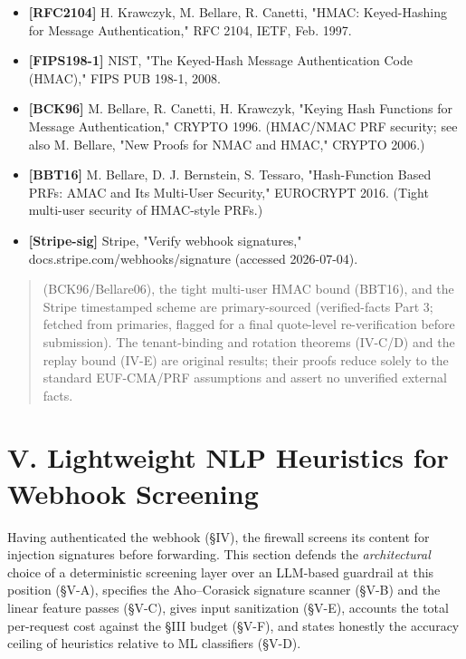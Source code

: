 \begin{itemize}
\tightlist
\item
  \textbf{{[}RFC2104{]}} H. Krawczyk, M. Bellare, R. Canetti, "HMAC:
  Keyed-Hashing for Message Authentication," RFC 2104, IETF, Feb. 1997.
\item
  \textbf{{[}FIPS198-1{]}} NIST, "The Keyed-Hash Message Authentication
  Code (HMAC)," FIPS PUB 198-1, 2008.
\item
  \textbf{{[}BCK96{]}} M. Bellare, R. Canetti, H. Krawczyk, "Keying Hash
  Functions for Message Authentication," CRYPTO 1996. (HMAC/NMAC PRF
  security; see also M. Bellare, "New Proofs for NMAC and HMAC," CRYPTO
  2006.)
\item
  \textbf{{[}BBT16{]}} M. Bellare, D. J. Bernstein, S. Tessaro,
  "Hash-Function Based PRFs: AMAC and Its Multi-User Security,"
  EUROCRYPT 2016. (Tight multi-user security of HMAC-style PRFs.)
\item
  \textbf{{[}Stripe-sig{]}} Stripe, "Verify webhook signatures,"
  docs.stripe.com/webhooks/signature (accessed 2026-07-04).
\end{itemize}

\begin{quote}
(BCK96/Bellare06), the tight multi-user HMAC bound (BBT16), and the
Stripe timestamped scheme are primary-sourced (verified-facts Part 3;
fetched from primaries, flagged for a final quote-level re-verification
before submission). The tenant-binding and rotation theorems (IV-C/D)
and the replay bound (IV-E) are original results; their proofs reduce
solely to the standard EUF-CMA/PRF assumptions and assert no unverified
external facts.
\end{quote}

\section{V. Lightweight NLP Heuristics for Webhook
Screening}\label{v-lightweight-nlp-heuristics-for-webhook-screening}

Having authenticated the webhook (§IV), the firewall screens its content
for injection signatures before forwarding. This section defends the
\emph{architectural} choice of a deterministic screening layer over an
LLM-based guardrail at this position (§V-A), specifies the Aho--Corasick
signature scanner (§V-B) and the linear feature passes (§V-C), gives
input sanitization (§V-E), accounts the total per-request cost against
the §III budget (§V-F), and states honestly the accuracy ceiling of
heuristics relative to ML classifiers (§V-D).

